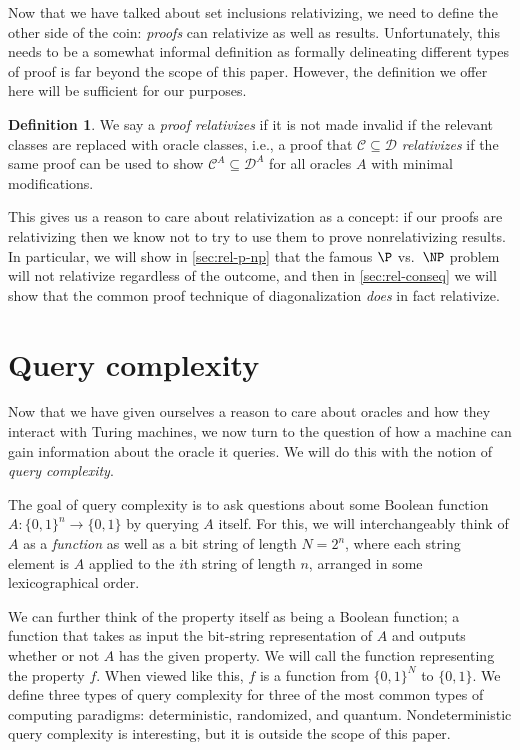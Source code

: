 \documentclass[english,12pt]{reedthesis}
\theoremstyle{plain}
\theoremstyle{definition}
\newtheorem{defn}[defn]{Definition}
\theoremstyle{remark}
\begin{document}
Now that we have talked about set inclusions relativizing, we need to define the
other side of the coin: \emph{proofs} can relativize as well as results.
Unfortunately, this needs to be a somewhat informal definition as formally
delineating different types of proof is far beyond the scope of this paper.
However, the definition we offer here will be sufficient for our purposes.

\begin{defn}\label{def:relativizing-result}
  We say a \emph{proof relativizes} if it is not made invalid if the relevant
  classes are replaced with oracle classes, i.e., a proof that $\mathcal{C} \subseteq \mathcal{D}$
  \emph{relativizes} if the same proof can be used to show $\mathcal{C}^{A} \subseteq \mathcal{D}^{A}$ for
  all oracles $A$ with minimal modifications.
\end{defn}

This gives us a reason to care about relativization as a concept: if our proofs
are relativizing then we know not to try to use them to prove nonrelativizing
results. In particular, we will show in \cref{sec:rel-p-np} that the famous $\P$
vs.\ $\NP$ problem will not relativize regardless of the outcome, and then in
\cref{sec:rel-conseq} we will show that the common proof technique of
diagonalization \emph{does} in fact relativize.

\section{Query complexity}\label{sec:query-complexity}

Now that we have given ourselves a reason to care about oracles and how they
interact with Turing machines, we now turn to the question of how a machine can
gain information about the oracle it queries. We will do this with the notion of
\emph{query complexity}.

The goal of query complexity is to ask questions about some Boolean function
$A\colon \{0, 1\}^{n} \rightarrow \{0, 1\}$ by querying $A$ itself. For this, we will
interchangeably think of $A$ as a \emph{function} as well as a bit string of
length $N = 2^{n}$, where each string element is $A$ applied to the $i$th string
of length $n$, arranged in some lexicographical
order. %

We can further think of the property itself as being a Boolean function; a
function that takes as input the bit-string representation of $A$ and outputs
whether or not $A$ has the given property. We will call the function
representing the property $f$. When viewed like this, $f$ is a function from
$\{0, 1\}^{N}$ to $\{0, 1\}$. We define three types of query complexity for
three of the most common types of computing paradigms: deterministic,
randomized, and quantum. Nondeterministic query complexity is interesting, but
it is outside the scope of this paper.
\end{document}
